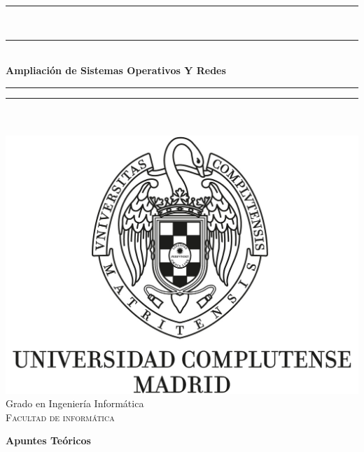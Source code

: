 %
%
% 
%




\thispagestyle{empty}
\vspace*{9mm}
\begin{center}
    \rule[0.5ex]{\linewidth}{2pt}\vspace*{-\baselineskip}\vspace*{4.2pt}\\
    \rule[0.5ex]{\linewidth}{1pt}\\
    [3.1mm]
    {\textbf{\LARGE{Ampliación de Sistemas Operativos Y Redes}} }\\[3mm] %
    
    \rule[0.5ex]{\linewidth}{1pt}\vspace*{-\baselineskip}\vspace{4.2pt}
    \rule[0.5ex]{\linewidth}{2pt}\\
    \vspace{13mm}
    {\large\textsc{}}\\ %
    \vspace{11mm}
    \includegraphics[scale=0.3]{img/logo_UCM.jpg}\\ %
    \vspace{6mm}
    {\large Grado en Ingeniería Informática\\    %
    \textsc{Facultad de informática}}\\ %
    \vspace{19mm}
    \begin{minipage}{10cm}
    \begin{center}
      \textbf{Apuntes Teóricos}\\
      \vspace{2mm}
    \end{center}
    \vspace{4mm}
    

\end{minipage}
\end{center}
